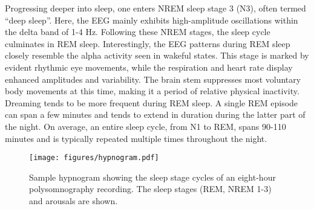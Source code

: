 \documentclass[
  10pt,
]{scrbook}
\begin{document}
Progressing deeper into sleep, one enters NREM sleep stage 3 (N3), often
termed ``deep sleep''. Here, the EEG mainly exhibits high-amplitude
oscillations within the delta band of 1-4 Hz. Following these NREM
stages, the sleep cycle culminates in REM sleep. Interestingly, the EEG
patterns during REM sleep closely resemble the alpha activity seen in
wakeful states. This stage is marked by evident rhythmic eye movements,
while the respiration and heart rate display enhanced amplitudes and
variability. The brain stem suppresses most voluntary body movements at
this time, making it a period of relative physical inactivity. Dreaming
tends to be more frequent during REM sleep. A single REM episode can
span a few minutes and tends to extend in duration during the latter
part of the night. On average, an entire sleep cycle, from N1 to REM,
spans 90-110 minutes and is typically repeated multiple times throughout
the night.

\begin{figure}

{\centering \texttt{[image: figures/hypnogram.pdf]}

}

\caption{\label{fig-hypno}Sample hypnogram showing the sleep stage
cycles of an eight-hour polysomnography recording. The sleep stages
(REM, NREM 1-3) and arousals are shown.}

\end{figure}
\end{document}
